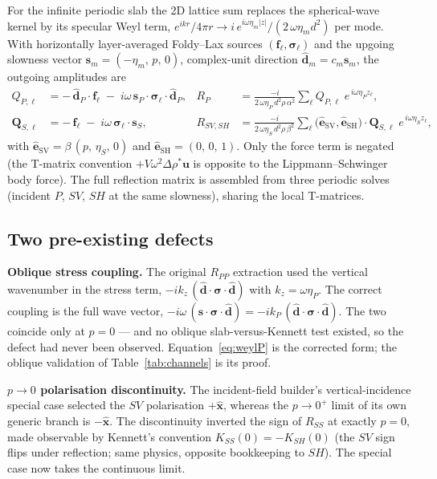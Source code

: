 \documentclass[11pt,a4paper]{article}
\newcommand{\Drho}{\Delta\rho}
\newcommand{\bu}{\mathbf{u}}
\newcommand{\bfv}{\mathbf{f}}
\newcommand{\bsv}{\mathbf{s}}
\newcommand{\bd}{\hat{\mathbf{d}}}
\newcommand{\bsig}{\boldsymbol{\sigma}}
\newcommand{\svhat}{\hat{\mathbf{e}}_{\mathrm{SV}}}
\newcommand{\shhat}{\hat{\mathbf{e}}_{\mathrm{SH}}}
\newcommand{\etaP}{\eta_{P}}
\newcommand{\etaS}{\eta_{S}}
\begin{document}
For the infinite periodic slab the 2D lattice sum replaces the
spherical-wave kernel by its specular Weyl term,
$e^{ikr}/4\pi r \to i\,e^{i\omega\eta_m |z|}/(2\,\omega\eta_m d^2)$ per
mode.  With horizontally layer-averaged Foldy--Lax sources
$(\bfv_\ell, \bsig_\ell)$ and the upgoing slowness vector
$\bsv_m = (-\eta_m,\, p,\, 0)$, complex-unit direction
$\bd_m = c_m \bsv_m$, the outgoing amplitudes are
\begin{align}
  Q_{P,\ell} &= -\,\bd_P\!\cdot\!\bfv_\ell
               \;-\; i\omega\,\bsv_P\!\cdot\!\bsig_\ell\!\cdot\!\bd_P,
  &
  R_P &= \frac{-i}{2\,\omega\etaP\, d^2 \rho\,\alpha^2}
         \sum_\ell Q_{P,\ell}\; e^{\,i\omega\etaP z_\ell},
  \label{eq:weylP}\\
  \mathbf{Q}_{S,\ell} &= -\,\bfv_\ell
               \;-\; i\omega\,\bsig_\ell\!\cdot\!\bsv_S,
  &
  R_{SV,SH} &= \frac{-i}{2\,\omega\etaS\, d^2 \rho\,\beta^2}
         \sum_\ell
         \bigl(\svhat,\shhat\bigr)\!\cdot\!\mathbf{Q}_{S,\ell}\;
         e^{\,i\omega\etaS z_\ell},
  \label{eq:weylS}
\end{align}
with $\svhat = \beta\,(p,\,\etaS,\,0)$ and
$\shhat = (0,\,0,\,1)$.  Only the force term is negated (the T-matrix
convention $+V\omega^2\Drho^* \bu$ is opposite to the
Lippmann--Schwinger body force).  The full reflection matrix is
assembled from three periodic solves (incident $P$, $SV$, $SH$ at the
same slowness), sharing the local T-matrices.

\subsection{Two pre-existing defects}
\label{sec:bugs}

\textbf{Oblique stress coupling.}  The original $R_{PP}$ extraction used
the vertical wavenumber in the stress term,
$-i k_z\,(\bd\!\cdot\!\bsig\!\cdot\!\bd)$ with $k_z = \omega\etaP$.  The
correct coupling is the full wave vector,
$-i\omega\,(\bsv\!\cdot\!\bsig\!\cdot\!\bd) =
 -i k_P\,(\bd\!\cdot\!\bsig\!\cdot\!\bd)$.  The two coincide only at
$p=0$ --- and no oblique slab-versus-Kennett test existed, so the defect
had never been observed.  Equation~\eqref{eq:weylP} is the corrected
form; the oblique validation of Table~\ref{tab:channels} is its proof.

\textbf{$p\to 0$ polarisation discontinuity.}  The incident-field
builder's vertical-incidence special case selected the $SV$ polarisation
$+\hat{\mathbf{x}}$, whereas the $p\to 0^{+}$ limit of its own generic
branch is $-\hat{\mathbf{x}}$.  The discontinuity inverted the sign of
$R_{SS}$ at exactly $p=0$, made observable by Kennett's convention
$K_{SS}(0) = -K_{SH}(0)$ (the $SV$ sign flips under reflection; same
physics, opposite bookkeeping to $SH$).  The special case now takes the
continuous limit.
\end{document}
